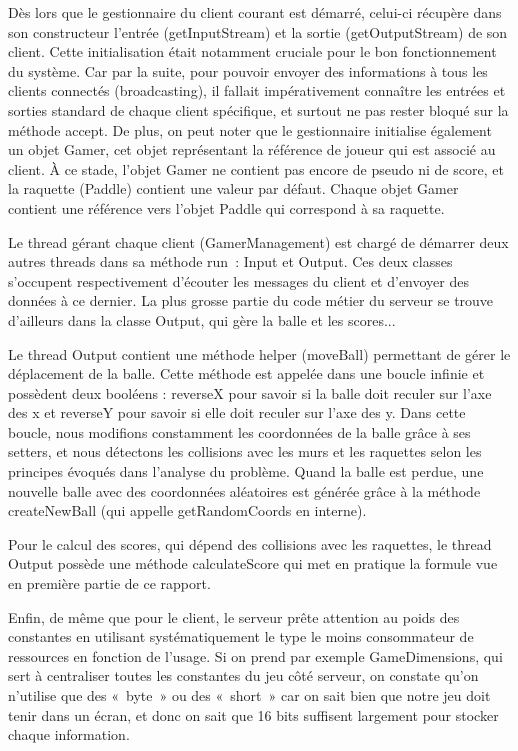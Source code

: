 \documentclass[a4paper,12pt]{article}
\begin{document}
Dès lors que le gestionnaire du client courant est démarré, celui-ci récupère dans son constructeur l'entrée (getInputStream) et la sortie (getOutputStream) de son client. Cette initialisation était notamment cruciale pour le bon fonctionnement du système. Car par la suite, pour pouvoir envoyer des informations à tous les clients connectés (broadcasting), il fallait impérativement connaître les entrées et sorties standard de chaque client spécifique, et surtout ne pas rester bloqué sur la méthode accept. De plus, on peut noter que le gestionnaire initialise également un objet Gamer, cet objet représentant la référence de joueur qui est associé au client. À ce stade, l'objet Gamer ne contient pas encore de pseudo ni de score, et la raquette (Paddle) contient une valeur par défaut. Chaque objet Gamer contient une référence vers l'objet Paddle qui correspond à sa raquette.

Le thread gérant chaque client (GamerManagement) est chargé de démarrer deux autres threads dans sa méthode run~: Input et Output. Ces deux classes s'occupent respectivement d'écouter les messages du client et d'envoyer des données à ce dernier. La plus grosse partie du code métier du serveur se trouve d'ailleurs dans la classe Output, qui gère la balle et les scores...

Le thread Output contient une méthode helper (moveBall) permettant de gérer le déplacement de la balle. Cette méthode est appelée dans une boucle infinie et possèdent deux booléens : reverseX pour savoir si la balle doit reculer sur l'axe des x et reverseY pour savoir si elle doit reculer sur l'axe des y. Dans cette boucle, nous modifions constamment les coordonnées de la balle grâce à ses setters, et nous détectons les collisions avec les murs et les raquettes selon les principes évoqués dans l'analyse du problème. Quand la balle est perdue, une nouvelle balle avec des coordonnées aléatoires est générée grâce à la méthode createNewBall (qui appelle getRandomCoords en interne).

Pour le calcul des scores, qui dépend des collisions avec les raquettes, le thread Output possède une méthode calculateScore qui met en pratique la formule vue en première partie de ce rapport.

Enfin, de même que pour le client, le serveur prête attention au poids des constantes en utilisant systématiquement le type le moins consommateur de ressources en fonction de l'usage. Si on prend par exemple GameDimensions, qui sert à centraliser toutes les constantes du jeu côté serveur, on constate qu'on n'utilise que des «~byte~» ou des «~short~» car on sait bien que notre jeu doit tenir dans un écran, et donc on sait que 16 bits suffisent largement pour stocker chaque information.
\end{document}
